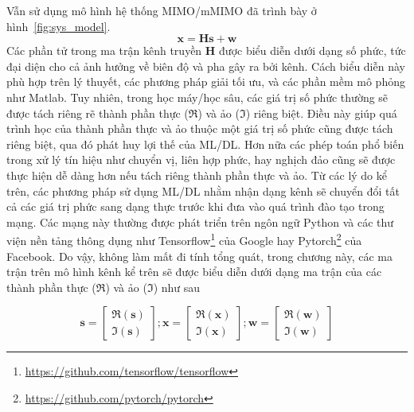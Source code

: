 Vẫn sử dụng mô hình hệ thống MIMO/mMIMO đã trình bày ở hình~\ref{fig:sys_model}.
\begin{equation}
    \mathbf{x} = \mathbf{H} \mathbf{s} + \mathbf{w}
\end{equation}
Các phần tử trong ma trận kênh truyền $\mathbf{H}$ được biểu diễn dưới dạng số phức, tức đại diện cho cả ảnh hưởng về biên độ và pha gây ra bởi kênh. Cách biểu diễn này phù hợp trên lý thuyết, các phương pháp giải tối ưu, và các phần mềm mô phỏng như Matlab. Tuy nhiên, trong học máy/học sâu, các giá trị số phức thường sẽ được tách riêng rẽ thành phần thực ($\Re$) và ảo ($\Im$) riêng biệt. Điều này giúp quá trình học của thành phần thực và ảo thuộc một giá trị số phức cũng được tách riêng biệt, qua đó phát huy lợi thế của ML/DL. Hơn nữa các phép toán phổ biến trong xử lý tín hiệu như chuyển vị, liên hợp phức, hay nghịch đảo cũng sẽ được thực hiện dễ dàng hơn nếu tách riêng thành phần thực và ảo.
Từ các lý do kể trên, các phương pháp sử dụng ML/DL nhằm nhận dạng kênh sẽ chuyển đổi tất cả các giá trị phức sang dạng thực trước khi đưa vào quá trình đào tạo trong mạng. Các mạng này thường được phát triển trên ngôn ngữ Python và các thư viện nền tảng thông dụng như Tensorflow\footnote{\url{https://github.com/tensorflow/tensorflow}} của Google hay Pytorch\footnote{\url{https://github.com/pytorch/pytorch}} của Facebook. Do vậy, không làm mất đi tính tổng quát, trong chương này, các ma trận trên mô hình kênh kể trên sẽ được biểu diễn dưới dạng ma trận của các thành phần thực ($\Re$) và ảo ($\Im$) như sau

\begin{equation}
\label{eq:matrixtras1}
    \mathbf{s}=\left[\begin{array}{l}
    \Re(\mathbf{s}) \\
    \Im(\mathbf{s})
    \end{array}\right] ;
    \mathbf{x}=\left[\begin{array}{l}
    \Re(\mathbf{x}) \\
    \Im(\mathbf{x})
    \end{array}\right] ; 
    \mathbf{w}=\left[\begin{array}{l}
    \Re(\mathbf{w}) \\
    \Im(\mathbf{w})
    \end{array}\right]
\end{equation}

